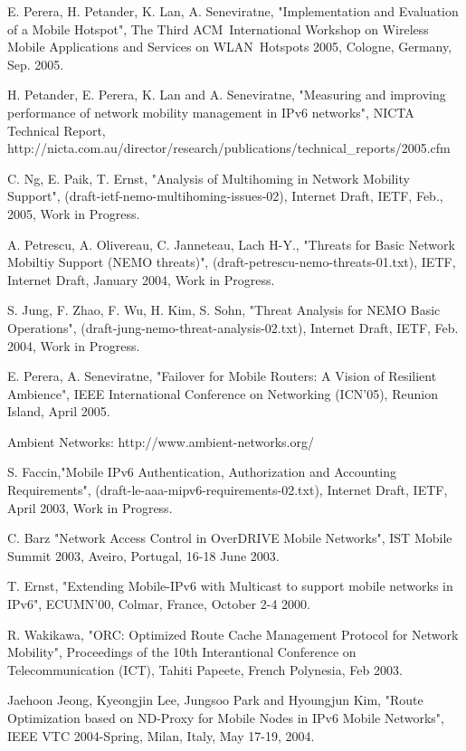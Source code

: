 \begin{thebibliography}{99}
E. Perera, H. Petander, K. Lan, A. Seneviratne, "Implementation and
Evaluation of a Mobile Hotspot", The Third ACM\ International
Workshop on Wireless Mobile Applications and Services on WLAN\
Hotspots 2005, Cologne, Germany, Sep. 2005.

H. Petander, E. Perera, K. Lan and A. Seneviratne, "Measuring and
improving performance of network mobility management in IPv6
networks", NICTA Technical Report,
http://nicta.com.au/director/research/publications/technical\_reports/2005.cfm

C. Ng, E. Paik, T. Ernst, "Analysis of Multihoming in Network
Mobility Support", (draft-ietf-nemo-multihoming-issues-02), Internet
Draft, IETF, Feb., 2005, Work in Progress.

A. Petrescu, A. Olivereau, C. Janneteau, Lach H-Y., "Threats for
Basic Network Mobiltiy Support (NEMO threats)",
(draft-petrescu-nemo-threats-01.txt), IETF, Internet Draft, January
2004, Work in Progress.

S. Jung, F. Zhao, F. Wu, H. Kim, S. Sohn, "Threat Analysis for NEMO
Basic Operations", (draft-jung-nemo-threat-analysis-02.txt),
Internet Draft, IETF, Feb. 2004, Work in Progress.

E. Perera, A. Seneviratne, "Failover for Mobile Routers: A Vision of
Resilient Ambience", IEEE International Conference on Networking
(ICN'05), Reunion Island, April 2005.

Ambient Networks: http://www.ambient-networks.org/

S. Faccin,"Mobile IPv6 Authentication, Authorization and Accounting
Requirements", (draft-le-aaa-mipv6-requirements-02.txt), Internet
Draft, IETF, April 2003, Work in Progress.

C. Barz "Network Access Control in OverDRIVE Mobile Networks", IST
Mobile Summit 2003, Aveiro, Portugal, 16-18 June 2003.

T. Ernst, "Extending Mobile-IPv6 with Multicast to support mobile
networks in IPv6", ECUMN'00, Colmar, France, October 2-4 2000.

R. Wakikawa, "ORC: Optimized Route Cache Management Protocol for
Network Mobility", Proceedings of the 10th Interantional Conference
on Telecommunication (ICT), Tahiti Papeete, French Polynesia, Feb
2003.

Jaehoon Jeong, Kyeongjin Lee, Jungsoo Park and Hyoungjun Kim,
"Route Optimization based on ND-Proxy for Mobile Nodes in IPv6
Mobile Networks", IEEE VTC 2004-Spring, Milan, Italy, May 17-19,
2004.


\end{thebibliography}
